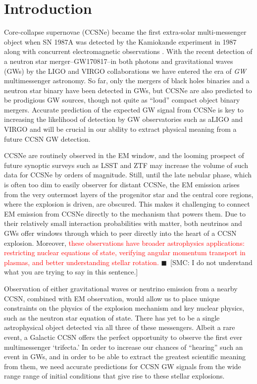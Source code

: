 \documentclass[twocolumn,times]{aastex62}  %
\newcommand{\smc}[1]{{\color{blue}$\blacksquare$~\textsf{[SMC: #1]}}}
\begin{document}
%

\section{Introduction}

Core-collapse supernovae (CCSNe) became the first extra-solar multi-messenger object when SN 1987A was detected by the Kamiokande experiment in 1987 \citep{hirata:1987} along with concurrent electromagnetic observations \citep[cf.][]{arnett:1989}. With the recent detection of a neutron star merger--GW170817--in both photons and gravitational waves (GWs) by the LIGO and VIRGO collaborations \citep{abbott:2016} we have entered the era of {\it GW} multimessenger astronomy.  
So far, only the mergers of black holes binaries and a neutron star binary have been detected in GWs, but CCSNe are also predicted to be prodigious GW sources, though not quite as ``loud'' compact object binary mergers.
Accurate prediction of the expected GW signal from CCSNe is key to increasing the likelihood of detection by GW observatories such as aLIGO and VIRGO and will be crucial in our ability to extract physical meaning from a future CCSN GW detection.

CCSNe are routinely observed in the EM window, and the looming prospect of future synoptic surveys such as LSST and ZTF may increase the volume of such data for CCSNe by orders of magnitude.
Still, until the late nebular phase, which is often too dim to easily observer for distant CCSNe, the EM emission arises from the very outermost layers of the progenitor star and the central core regions, where the explosion is driven, are obscured. 
This makes it challenging to connect EM emission from CCSNe directly to the mechanism that powers them.
Due to their relatively small interaction probabilities with matter, both neutrinos and GWs offer windows through which to peer directly into the heart of a CCSN explosion.  
Moreover, \textcolor{red}{these observations have broader astrophysics applications: restricting nuclear equations of state, verifying angular momentum transport in plasmas, and better understanding stellar rotation. } \smc{I do not understand what you are trying to say in this sentence.}

Observation of either gravitational waves or neutrino emission from a nearby CCSN, combined with EM observation, would allow us to place unique constraints on the physics of the explosion mechanism and key nuclear physics, such as the neutron star equation of state.  
There has yet to be a single astrophysical object detected via all three of these messengers.  
Albeit a rare event, a Galactic CCSN offers the perfect opportunity to observe the first ever multimessenger `trifecta.'  
In order to increase our chances of ``hearing'' such an event in GWs, and in order to be able to extract the greatest scientific meaning from them, we need accurate predictions for CCSN GW signals from the wide range range of initial conditions that give rise to these stellar explosions.
\end{document}
